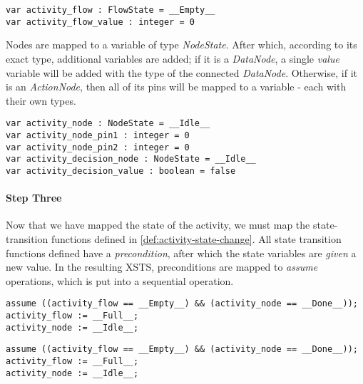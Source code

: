 \begin{lstlisting}[language=xsts]
var activity_flow : FlowState = __Empty__
var activity_flow_value : integer = 0
\end{lstlisting}

Nodes are mapped to a variable of type \emph{NodeState}. After which, according to its exact type, additional variables are added; if it is a \emph{DataNode}, a single \emph{value} variable will be added with the type of the connected \emph{DataNode}. Otherwise, if it is an \emph{ActionNode}, then all of its pins will be mapped to a variable - each with their own types.

\begin{lstlisting}[language=xsts]
var activity_node : NodeState = __Idle__
var activity_node_pin1 : integer = 0
var activity_node_pin2 : integer = 0
var activity_decision_node : NodeState = __Idle__
var activity_decision_value : boolean = false
\end{lstlisting}

\paragraph{Step Three} 

Now that we have mapped the state of the activity, we must map the state-transition functions defined in \autoref{def:activity-state-change}. All state transition functions defined have a \emph{precondition}, after which the state variables are \emph{given} a new value. In the resulting XSTS, preconditions are mapped to \emph{assume} operations, which is put into a sequential operation. 

\begin{lstlisting}[language=xsts]
assume ((activity_flow == __Empty__) && (activity_node == __Done__));
activity_flow := __Full__;
activity_node := __Idle__;
\end{lstlisting}



\begin{lstlisting}[language=xsts]
assume ((activity_flow == __Empty__) && (activity_node == __Done__));
activity_flow := __Full__;
activity_node := __Idle__;
\end{lstlisting}

